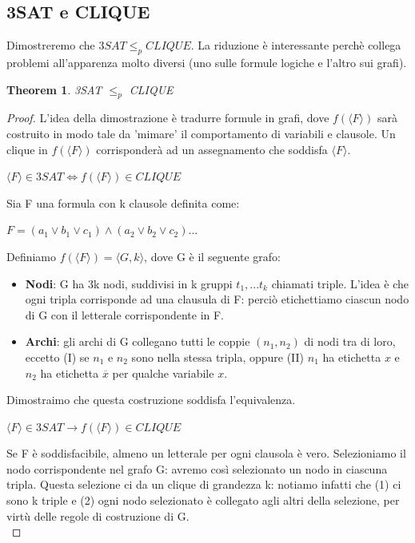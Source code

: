 \documentclass[a4paper, 12pt]{article}
\newtheorem{theorem}{Theorem}[section]
\begin{document}
\subsection{3SAT e CLIQUE}
Dimostreremo che $3SAT \leq_p CLIQUE$. La riduzione \`e interessante perch\`e collega problemi all'apparenza molto diversi (uno sulle formule logiche e l'altro sui grafi).
\begin{theorem}
\label{th:10}
3SAT $\leq_p$ CLIQUE
\end{theorem}
\begin{proof}
L'idea della dimostrazione \`e tradurre formule in grafi, dove $f(\langle F \rangle)$ sar\`a costruito in modo tale da 'mimare' il comportamento di variabili e clausole. Un clique in $f(\langle F \rangle)$ corrisponder\`a ad un assegnamento che soddisfa $\langle F \rangle$.
\begin{center}
$\langle F \rangle \in 3SAT \iff f(\langle F \rangle) \in CLIQUE$
\end{center}
Sia F una formula con k clausole definita come:
\begin{center}
$F = (a_1 \lor b_1 \lor c_1) \land (a_2 \lor b_2 \lor c_2) ...$
\end{center}
Definiamo $f(\langle F \rangle) = \langle G, k \rangle$, dove G \`e il seguente grafo:
\begin{itemize}
\item \textbf{Nodi}: G ha 3k nodi, suddivisi in k gruppi  $t_1,...t_k$ chiamati triple. L'idea \`e che ogni tripla corrisponde ad una clausula di F: perci\`o etichettiamo ciascun nodo di G con il letterale corrispondente in F.
\item \textbf{Archi}: gli archi di G collegano tutti le coppie $(n_1, n_2)$ di nodi tra di loro, eccetto (I) se $n_1$ e $n_2$ sono nella stessa tripla, oppure (II) $n_1$ ha etichetta $x$ e $n_2$ ha etichetta $\overline{x}$ per qualche variabile $x$.
\end{itemize}
Dimostraimo che questa costruzione soddisfa l'equivalenza.
\begin{center}
$\langle F \rangle \in 3SAT \rightarrow f(\langle F \rangle) \in CLIQUE$
\end{center}
Se F \`e soddisfacibile, almeno un letterale per ogni clausola \`e vero. Selezioniamo il nodo corrispondente nel grafo G: avremo cos\`i selezionato un nodo in ciascuna tripla. Questa selezione ci da un clique di grandezza k: notiamo infatti che (1) ci sono k triple e (2) ogni nodo selezionato \`e collegato agli altri della selezione, per virt\`u delle regole di costruzione di G.\\

\end{proof}
\end{document}
